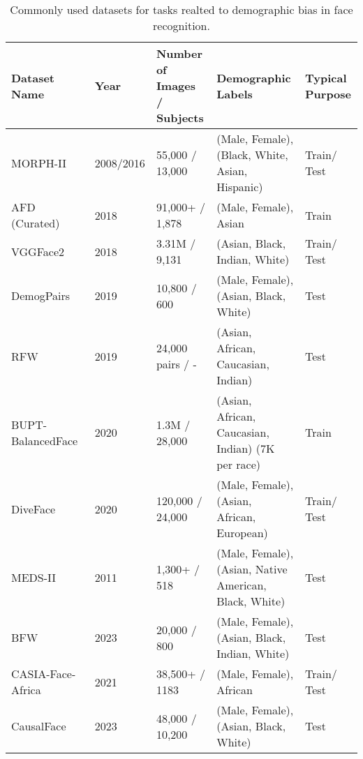 \begin{table*}[t]
\renewcommand{\arraystretch}{1.4}
\centering
\begin{tabular}{ l l l l l }
\toprule
\textbf{Dataset Name}     & \textbf{Year} & \textbf{Number of Images / Subjects} & \textbf{Demographic Labels} & \textbf{Typical Purpose} \\ \midrule
MORPH-II~\cite{bingham2017morph}           & 2008/2016     & 55,000 / 13,000  & (Male, Female), (Black, White, Asian, Hispanic) & Train/ Test \\ 
AFD (Curated)~\cite{kai_curation_method}\cite{xiong2018asian}   & 2018          & 91,000+  / 1,878   & (Male, Female), Asian      & Train \\ 
VGGFace2 ~\cite{cao2018vggface2}  & 2018          & 3.31M  / 9,131    & (Asian, Black, Indian, White)  & Train/ Test \\ 
DemogPairs~\cite{hupont2019demogpairs} & 2019          & 10,800 / 600     & (Male, Female), (Asian, Black, White) & Test \\ 
RFW~\cite{wang2019racial}   & 2019          & 24,000 pairs / -  & (Asian, African, Caucasian, Indian) & Test \\ 
BUPT-BalancedFace~\cite{wang2020mitigating} & 2020          & 1.3M / 28,000    & (Asian, African, Caucasian, Indian) (7K per race)   & Train \\ 
DiveFace~\cite{morales2020sensitivenets} & 2020          & 120,000 / 24,000   & (Male, Female), (Asian, African, European) & Train/ Test \\ 
MEDS-II~\cite{founds2011nist}             & 2011          & 1,300+ / 518    & (Male, Female), (Asian, Native American, Black, White)           & Test \\ 
BFW ~\cite{robinson2023balancing} \cite{robinson2020face} & 2023          & 20,000 / 800                  & (Male, Female), (Asian, Black, Indian, White) & Test \\ 
CASIA-Face-Africa~\cite{muhammad2021casia} & 2021 & 38,500+ / 1183    & (Male, Female), African & Train/ Test \\ 
CausalFace ~\cite{liang2023benchmarking} & 2023  & 48,000 / 10,200  & (Male, Female), (Asian, Black, White) & Test \\ 
\bottomrule
\end{tabular}
\caption{Commonly used datasets for tasks realted to demographic bias in face recognition.}
\label{tab:datasets}
\end{table*}
